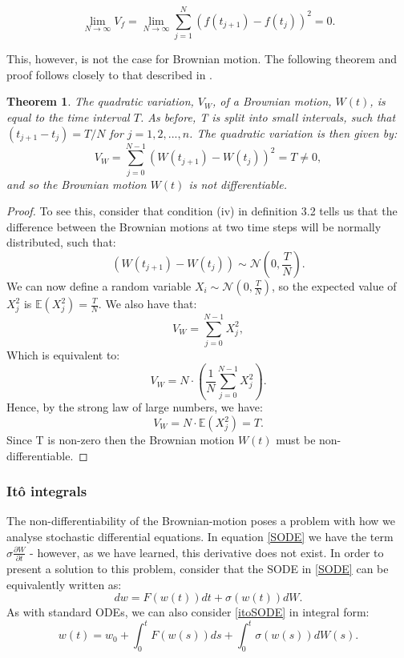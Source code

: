 \documentclass[12pt]{article}
\newtheorem{theorem}{Theorem}[section]
\begin{document}
$$\lim_{N \to \infty}V_f = \lim_{N \to \infty}\sum_{j=1}^N\left(f(t_{j+1}) - f(t_j)\right)^2 = 0. $$

This, however, is not the case for Brownian motion. The following theorem and proof follows closely to that described in \cite{Lee}.
\begin{theorem} \label{qvnondiff}
The quadratic variation, $V_W$, of a Brownian motion, $W(t)$, is equal to the time interval $T$. As before, T is split into small intervals, such that $(t_{j+1} - t_j) = T/N$ for $j = 1,2,...,n$. The quadratic variation is then given by:
$$V_W = \sum_{j=0}^{N-1}\left(W(t_{j+1})-W(t_j)\right)^2 = T \neq 0,$$ 
and so the Brownian motion $W(t)$ is not differentiable. 
\end{theorem}
\begin{proof}
To see this, consider that condition (iv) in definition 3.2 tells us that the difference between the Brownian motions at two time steps will be normally distributed, such that:
$$\left(W(t_{j+1})-W(t_j)\right)\sim \mathcal{N}\left(0,\frac{T}{N}\right).$$
We can now define a random variable $X_i \sim \mathcal{N}(0,\frac{T}{N})$, so the expected value of $X_j^2$ is  $ \mathbb{E} (X_j^2) = \frac{T}{N}$. We also have that:
\begin{equation*}
V_W = \sum_{j=0}^{N-1} X_j^2,
\end{equation*}
Which is equivalent to:
\begin{equation*}
V_W = N \cdot\left(\frac{1}{N}\sum_{j=0}^{N-1} X_j^2\right).
\end{equation*}
Hence, by the strong law of large numbers, we have:
$$V_W = N \cdot \mathbb{E}(X_j^2) = T.$$
Since T is non-zero then the Brownian motion $W(t)$ must be non-differentiable.
\end{proof}

\subsubsection{It\^{o} integrals}
The non-differentiability of the Brownian-motion poses a problem with how we analyse stochastic differential equations. In equation \eqref{SODE} we have the term $\sigma\frac{\partial W}{\partial t}$ - however, as we have learned, this derivative does not exist. In order to present a solution to this problem, consider that the SODE in \eqref{SODE} can be equivalently written as:
\begin{equation} \label{itoSODE}
d w = F(w(t))d t + \sigma(w(t)) d W.
\end{equation} 
As with standard ODEs, we can also consider \eqref{itoSODE} in integral form:
\begin{equation}
w(t) = w_0 + \int_0^t F(w(s)) d s + \int_0^t \sigma(w(s)) d W(s).
\end{equation}
\end{document}
